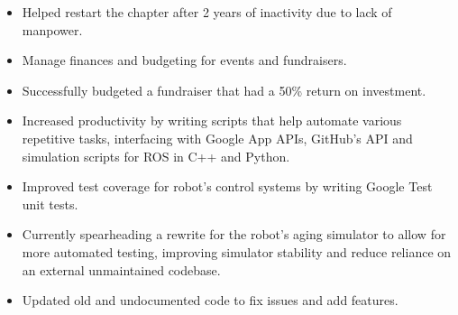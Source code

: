 




\begin{itemize}
  \item Helped restart the chapter after 2 years of inactivity due to lack of manpower.
  \item Manage finances and budgeting for events and fundraisers.
  \item Successfully budgeted a fundraiser that had a 50\% return on investment.
\end{itemize}
\divider\small

\begin{itemize}
  \item Increased productivity by writing scripts that help automate various repetitive tasks, interfacing with Google App APIs, GitHub’s API and simulation scripts for ROS in C++ and Python.
  \item Improved test coverage for robot’s control systems by writing Google Test unit tests.
  \item Currently spearheading a rewrite for the robot’s aging simulator to allow for more automated testing, improving simulator stability and reduce reliance on an external unmaintained codebase.
  \item Updated old and undocumented code to fix issues and add features.
\end{itemize}
\divider\small
